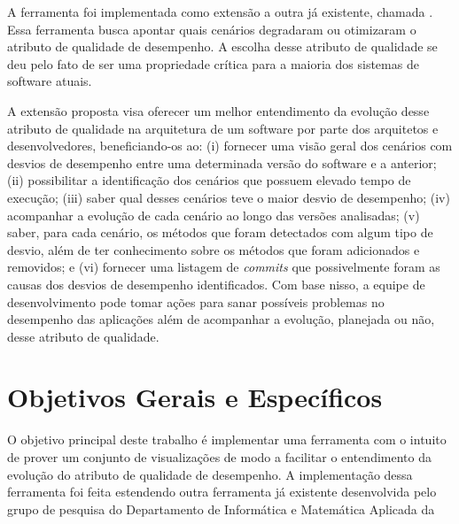 
A ferramenta foi implementada como extensão a outra já existente, chamada \textit{\perfMinerName} \cite{Pinto2015}. Essa ferramenta busca apontar quais cenários degradaram ou otimizaram o atributo de qualidade de desempenho. A escolha desse atributo de qualidade se deu pelo fato de ser uma propriedade crítica para a maioria dos sistemas de software atuais.

A extensão proposta visa oferecer um melhor entendimento da evolução desse atributo de qualidade na arquitetura de um software por parte dos arquitetos e desenvolvedores, beneficiando-os ao: (i) fornecer uma visão geral dos cenários com desvios de desempenho entre uma determinada versão do software e a anterior; (ii) possibilitar a identificação dos cenários que possuem elevado tempo de execução; (iii) saber qual desses cenários teve o maior desvio de desempenho; (iv) acompanhar a evolução de cada cenário ao longo das versões analisadas; (v) saber, para cada cenário, os métodos que foram detectados com algum tipo de desvio, além de ter conhecimento sobre os métodos que foram adicionados e removidos; e (vi) fornecer uma listagem de \textit{commits} que possivelmente foram as causas dos desvios de desempenho identificados. Com base nisso, a equipe de desenvolvimento pode tomar ações para sanar possíveis problemas no desempenho das aplicações além de acompanhar a evolução, planejada ou não, desse atributo de qualidade.


\section{Objetivos Gerais e Específicos} \label{sec:objetivos-gerais-especificos}

O objetivo principal deste trabalho é implementar uma ferramenta com o intuito de prover um conjunto de visualizações de modo a facilitar o entendimento da evolução do atributo de qualidade de desempenho. A implementação dessa ferramenta foi feita estendendo outra ferramenta já existente desenvolvida pelo grupo de pesquisa do Departamento de Informática e Matemática Aplicada da 

